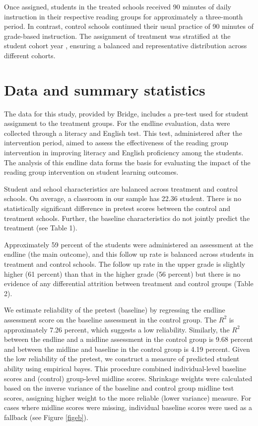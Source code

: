 \documentclass[12pt]{article}
\begin{document}
Once assigned, students in the treated schools received 90 minutes of daily instruction in their respective reading groups for approximately a three-month period. In contrast, control schools continued their usual practice of 90 minutes of grade-based instruction. The assignment of treatment was stratified at the student cohort year , ensuring a balanced and representative distribution across different cohorts. 

\section{Data and summary statistics}
\label{sec:data}

The data for this study, provided by Bridge, includes a pre-test used for student assignment to the treatment groups. For the endline evaluation, data were collected through a literacy and English test. This test, administered after the intervention period, aimed to assess the effectiveness of the reading group intervention in improving literacy and English proficiency among the students. The analysis of this endline data forms the basis for evaluating the impact of the reading group intervention on student learning outcomes.

Student and school characteristics are balanced across treatment and control schools. On average, a classroom in our sample has 22.36 student. There is no statistically significant difference in pretest scores between the control and treatment schools. Further, the baseline characteristics do not jointly predict the treatment (see Table 1). 

Approximately  59 percent of the students were administered an assessment at
the endline (the main outcome), and this follow up rate is balanced across students in treatment
and control schools. The follow up rate in the upper grade is slightly higher (61 percent) than that in the higher grade (56 percent) but there is no evidence of any differential attrition between treatment and control groups (Table 2). 

We estimate reliability of the pretest (baseline) by regressing the endline assessment score on the baseline assessment in the control group. The $R^2$ is approximately 7.26 percent, which suggests a low reliability. Similarly, the $R^2$ between the endline and a midline assessment in the control group is 9.68 percent and between the midline and baseline in the control group is 4.19 percent. Given the low reliability of the pretest, we construct a measure of predicted student ability using empirical bayes. This procedure combined individual-level baseline scores and (control) group-level midline scores. Shrinkage weights were calculated based on the inverse variance of the baseline and control group midline test scores, assigning higher weight to the more reliable (lower
variance) measure. For cases where midline scores were missing, individual baseline scores were used as a fallback (see Figure \ref{figeb}). 
\end{document}
